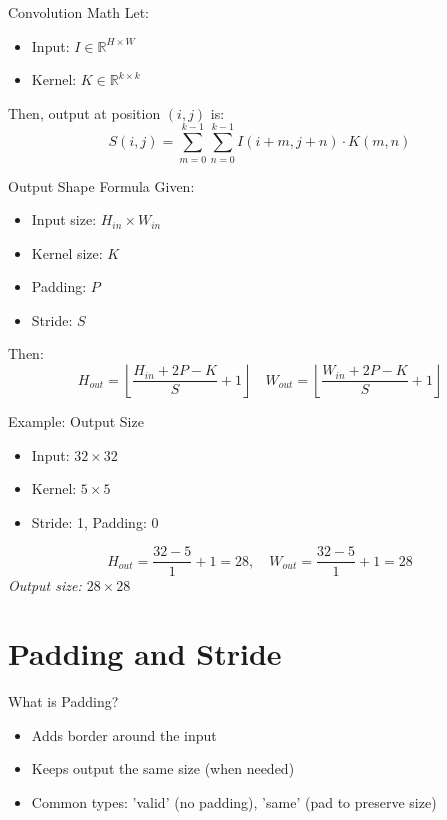 \documentclass{beamer}
\begin{document}
\begin{frame}{Convolution Math}
Let:
\begin{itemize}
    \item Input: \( I \in \mathbb{R}^{H \times W} \)
    \item Kernel: \( K \in \mathbb{R}^{k \times k} \)
\end{itemize}
Then, output at position \( (i, j) \) is:
\[
S(i, j) = \sum_{m=0}^{k-1} \sum_{n=0}^{k-1} I(i+m, j+n) \cdot K(m, n)
\]
\end{frame}

\begin{frame}{Output Shape Formula}
Given:
\begin{itemize}
    \item Input size: \( H_{in} \times W_{in} \)
    \item Kernel size: \( K \)
    \item Padding: \( P \)
    \item Stride: \( S \)
\end{itemize}
Then:
\[
H_{out} = \left\lfloor \frac{H_{in} + 2P - K}{S} + 1 \right\rfloor
\quad
W_{out} = \left\lfloor \frac{W_{in} + 2P - K}{S} + 1 \right\rfloor
\]
\end{frame}

\begin{frame}{Example: Output Size}
\begin{itemize}
    \item Input: \( 32 \times 32 \)
    \item Kernel: \( 5 \times 5 \)
    \item Stride: 1, Padding: 0
\end{itemize}
\[
H_{out} = \frac{32 - 5}{1} + 1 = 28,\quad
W_{out} = \frac{32 - 5}{1} + 1 = 28
\]
\textit{Output size: \( 28 \times 28 \)}
\end{frame}

\section{Padding and Stride}
\begin{frame}{What is Padding?}
\begin{itemize}
    \item Adds border around the input
    \item Keeps output the same size (when needed)
    \item Common types: 'valid' (no padding), 'same' (pad to preserve size)
\end{itemize}
\end{frame}
\end{document}
